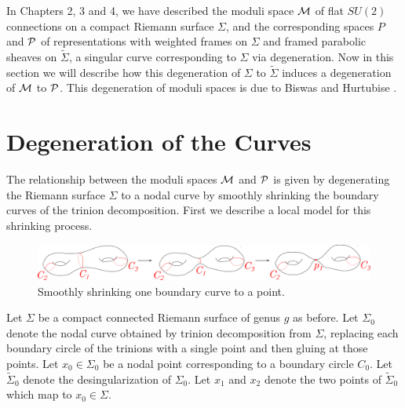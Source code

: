 
	In Chapters 2, 3 and 4, we have described the moduli space $\mathcal{M}$ of flat $SU(2)$ connections on a compact Riemann surface $\Sigma$, and the corresponding spaces $P$ and $\mathcal{P}$ of representations with weighted frames on $\Sigma$ and framed parabolic sheaves on $\tilde{\Sigma}$, a singular curve corresponding to $\Sigma$ via degeneration. Now in this section we will describe how this degeneration of $\Sigma$ to $\tilde{\Sigma}$ induces a degeneration of $\mathcal{M}$ to $\mathcal{P}$. This degeneration of moduli spaces is due to Biswas and Hurtubise \cite{biswas_degenerations_2021}. 
\section{Degeneration of the Curves}
	The relationship between the moduli spaces $\mathcal{M}$ and $\mathcal{P}$ is given by degenerating the Riemann surface $\Sigma$ to a nodal curve by smoothly shrinking the boundary curves of the trinion decomposition. First we describe a local model for this shrinking process.
	
	\begin{figure}[h]
		\centering
		\includegraphics[width=0.9\linewidth]{degen1pt}
		\caption{Smoothly shrinking one boundary curve to a point.}
		\label{fig:degen}
	\end{figure}
	
	Let $\Sigma$ be a compact connected Riemann surface of genus $g$ as before. Let $\Sigma_0$ denote the nodal curve obtained by trinion decomposition from $\Sigma$, replacing each boundary circle of the trinions with a single point and then gluing at those points. Let $x_0 \in \Sigma_0$ be a nodal point corresponding to a boundary circle $C_0$. Let $\tilde{\Sigma}_0$ denote the desingularization of $\Sigma_0$. Let $x_1$ and $x_2$ denote the two points of $\tilde{\Sigma}_0$ which map to $x_0 \in \Sigma$. 
	
